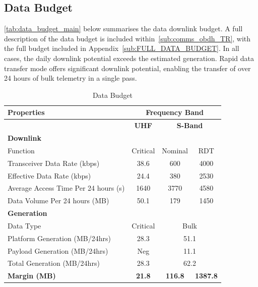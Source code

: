 \documentclass[a4paper, 11pt, conference]{IEEEtran}
\begin{document}
\subsection{Data Budget}

\autoref{tab:data_budget_main} below summarises the data downlink budget. A full description of the data budget is included within~\autoref{sub:comms_obdh_TR}, with the full budget included in Appendix~\ref{sub:FULL_DATA_BUDGET}. In all cases, the daily downlink potential exceeds the estimated generation. Rapid data transfer mode offers significant downlink potential, enabling the transfer of over 24 hours of bulk telemetry in a single pass.

\begin{table}[!htbp]
    \centering
    \caption{Data Budget}
    \label{sub:data_budget}
    \label{tab:data_budget_main}
    \begin{tabular}{l c c c}
        \toprule
        \textbf{Properties} & \multicolumn{3}{c}{\textbf{Frequency Band}} \\
        \midrule
        & \textbf{UHF} & \multicolumn{2}{c}{\textbf{S-Band}} \\
        \midrule
        \multicolumn{4}{l}{\textbf{Downlink}} \\ %
        \midrule
        Function & Critical & Nominal & RDT \\
        Transceiver Data Rate (kbps) & 38.6 & 600 & 4000 \\
        Effective Data Rate (kbps) & 24.4 & 380 & 2530 \\
        Average Access Time Per 24 hours (s) & 1640 & 3770 & 4580 \\
        Data Volume Per 24 hours (MB) & 50.1 & 179 & 1450 \\
        \midrule
        \multicolumn{4}{l}{\textbf{Generation}} \\ %
        \midrule
        Data Type & Critical & \multicolumn{2}{c}{Bulk} \\ %
        Platform Generation (MB/24hrs) & 28.3 & \multicolumn{2}{c}{51.1} \\
        Payload Generation (MB/24hrs) & Neg & \multicolumn{2}{c}{11.1} \\
        Total Generation (MB/24hrs) & 28.3 & \multicolumn{2}{c}{62.2} \\
        \midrule
        \textbf{Margin (MB)} & \textbf{21.8} & \textbf{116.8} & \textbf{1387.8} \\
        \bottomrule
    \end{tabular}
\end{table}
\FloatBarrier
\end{document}
